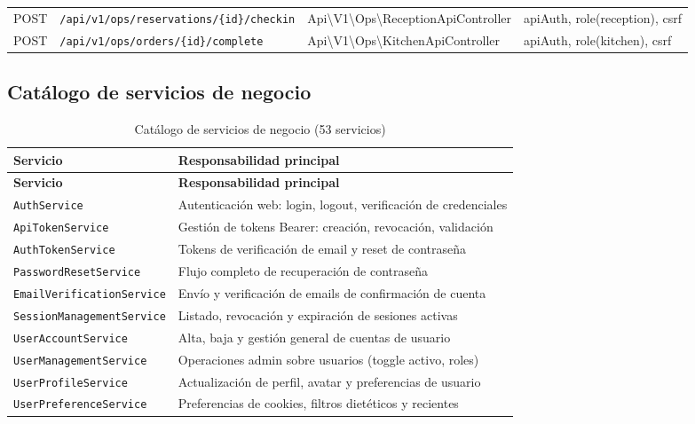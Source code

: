 \documentclass[12pt,a4paper,twoside,openright]{report}
\begin{document}
\begin{landscape}
\begin{longtable}{@{}llll@{}}
  POST & \texttt{/api/v1/ops/reservations/\{id\}/checkin}& Api\textbackslash V1\textbackslash Ops\textbackslash ReceptionApiController & apiAuth, role(reception), csrf\\
  POST & \texttt{/api/v1/ops/orders/\{id\}/complete}& Api\textbackslash V1\textbackslash Ops\textbackslash KitchenApiController & apiAuth, role(kitchen), csrf\\
\end{longtable}
\end{landscape}

\subsection{Catálogo de servicios de negocio}
\label{subsec:servicios}

\begin{longtable}{@{}lp{8cm}@{}}
  \caption{Catálogo de servicios de negocio (53 servicios)}
  \label{tab:servicios}\\
  \toprule
  \textbf{Servicio} & \textbf{Responsabilidad principal}\\
  \midrule
  \endfirsthead
  \toprule
  \textbf{Servicio} & \textbf{Responsabilidad principal}\\
  \midrule
  \endhead
  \bottomrule
  \endfoot
  \texttt{AuthService}                 & Autenticación web: login, logout, verificación de credenciales\\
  \texttt{ApiTokenService}             & Gestión de tokens Bearer: creación, revocación, validación\\
  \texttt{AuthTokenService}            & Tokens de verificación de email y reset de contraseña\\
  \texttt{PasswordResetService}        & Flujo completo de recuperación de contraseña\\
  \texttt{EmailVerificationService}    & Envío y verificación de emails de confirmación de cuenta\\
  \texttt{SessionManagementService}    & Listado, revocación y expiración de sesiones activas\\
  \texttt{UserAccountService}          & Alta, baja y gestión general de cuentas de usuario\\
  \texttt{UserManagementService}       & Operaciones admin sobre usuarios (toggle activo, roles)\\
  \texttt{UserProfileService}          & Actualización de perfil, avatar y preferencias de usuario\\
  \texttt{UserPreferenceService}       & Preferencias de cookies, filtros dietéticos y recientes\\

\end{longtable}
\end{document}
